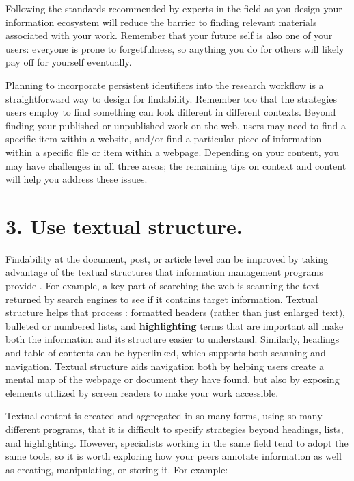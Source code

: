 \documentclass[10pt,letterpaper]{article}
\newcommand{\rulemajor}[1]{\section*{#1}}
\begin{document}
\noindent
Following the standards recommended by experts\cite{Wilkinson2016} in the field 
as you design your information ecosystem will reduce the barrier to finding relevant materials associated with your work. Remember that your future self is also one of your users: everyone is prone to 
forgetfulness, so anything you do for others will likely pay off for yourself
eventually\cite{Briney2015}.

Planning to incorporate persistent identifiers into the research workflow is a straightforward way to design for findability. Remember too that the strategies users employ to find something can look different 
in different contexts. Beyond finding your published or unpublished work on the web, users may need to find a specific item within a website, and/or find a particular 
piece of information within a specific file or item within a webpage. Depending on 
your content, you may have challenges in all three areas; the remaining tips on 
context and content will help you address these issues.

\rulemajor{3. Use textual structure.}

Findability at the document, post, or article level can be improved by taking
advantage of the textual structures that information management programs provide
\cite{Hedden2016}. For example, a key part of searching the web is scanning the
text returned by search engines to see if it contains target information.
Textual structure helps that process \cite{Krug2014}: formatted headers (rather
than just enlarged text), bulleted or numbered lists, and \textbf{highlighting}
terms that are important all make both the information and its structure easier
to understand. Similarly, headings and table of contents can be hyperlinked,
which supports both scanning and navigation.
Textual structure aids navigation both by helping users create a mental map of the 
webpage or document they have found, but also by exposing elements utilized by 
screen readers to make your work accessible.

Textual content is created and aggregated in so many forms, using so many
different programs, that it is difficult to specify strategies beyond headings,
lists, and highlighting. However, specialists working in the same field tend to
adopt the same tools, so it is worth exploring how your peers annotate
information as well as creating, manipulating, or storing it. For example:
\end{document}
